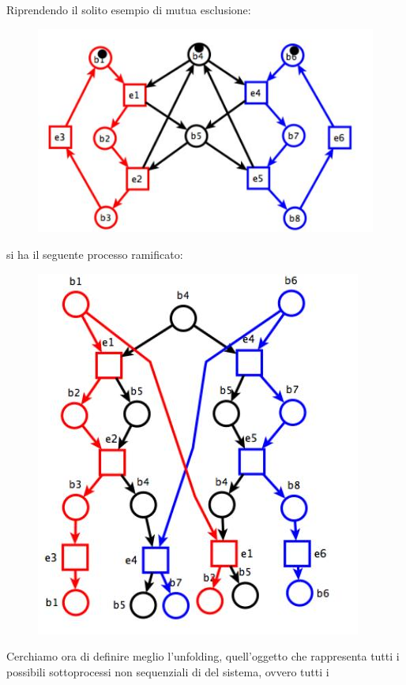 \begin{esempio}
  Riprendendo il solito esempio di mutua esclusione:
  \begin{figure}[H]
    \centering
    \includegraphics[scale = 0.45]{img/ram0.jpg} 
  \end{figure}
  \newpage
  si ha il seguente processo ramificato:
  \begin{figure}[H]
    \centering
    \includegraphics[scale = 0.45]{img/ram.jpg} 
  \end{figure}
  
\end{esempio}
\noindent
Cerchiamo ora di definire meglio l'unfolding, quell'oggetto che rappresenta
tutti i possibili sottoprocessi non sequenziali di del sistema, ovvero tutti i
